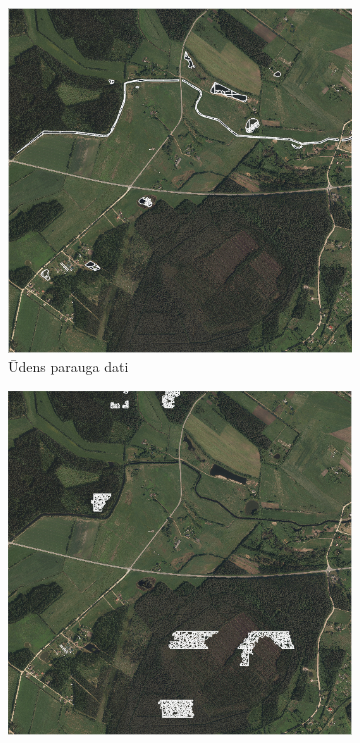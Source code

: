 \documentclass[12pt,paper=a4]{report}
\begin{document}
\begin{figure}[h!]
\centering
\begin{subfigure}[b]{.32\linewidth}
\includegraphics[width=\linewidth]{udensSampleNN}
\caption{Ūdens parauga dati}\label{fig:udensSampleNN}
\end{subfigure}
\begin{subfigure}[b]{.32\linewidth}
\includegraphics[width=\linewidth]{kokiSampleNN}

\end{subfigure}
\end{figure}
\end{document}
